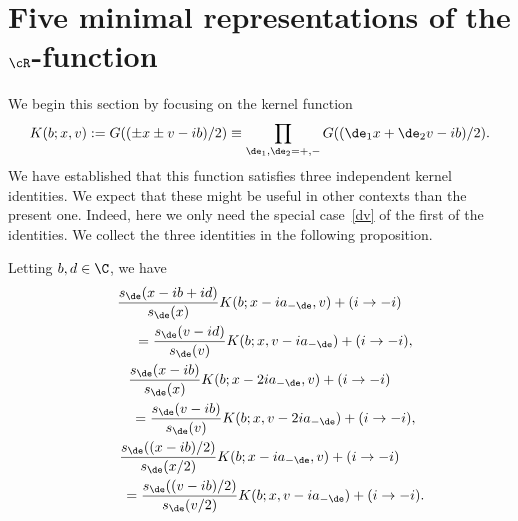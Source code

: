 \section[Five minimal representations of the $\cR$-function]{Five minimal representations of the $\boldsymbol{\cR}$-function}\label{section3}

We begin this section by focusing on the kernel function
\begin{gather}
K(b;x,v):=G((\pm x \pm v -ib)/2)\equiv\prod_{\de_1,\de_2=+,-}G((\de_1 x+\de_2 v-ib)/2).
\end{gather}
We have established that this function satisf\/ies three independent kernel identities. We expect that these might be useful in other contexts than the present one. Indeed, here we only need the special case~\eqref{dv} of the f\/irst of the identities. We  collect the three identities in the following proposition.

\begin{prop}\label{proposition3.1}
Letting $b,d\in\C$, we have
\begin{gather}
\frac{s_{\de}(x-ib+id)}{s_{\de}(x)}K(b;x-ia_{-\de},v)+(i\to -i)\nonumber\\
\qquad{} =\frac{s_{\de}(v-id)}{s_{\de}(v)}K(b;x,v-ia_{-\de})+(i\to -i),\label{idd}
\\
\frac{s_{\de}(x-ib)}{s_{\de}(x)}K(b;x-2ia_{-\de},v)+(i\to -i)\nonumber\\
\qquad{}=
\frac{s_{\de}(v-ib)}{s_{\de}(v)}K(b;x,v-2ia_{-\de})+(i\to -i),\label{id2}
\\
\frac{s_{\de}((x-ib)/2)}{s_{\de}(x/2)}K(b;x-ia_{-\de},v)+(i\to -i)\nonumber\\
\qquad{} =
\frac{s_{\de}((v-ib)/2)}{s_{\de}(v/2)}K(b;x,v-ia_{-\de})+(i\to -i).\label{id3}
\end{gather}
\end{prop}

